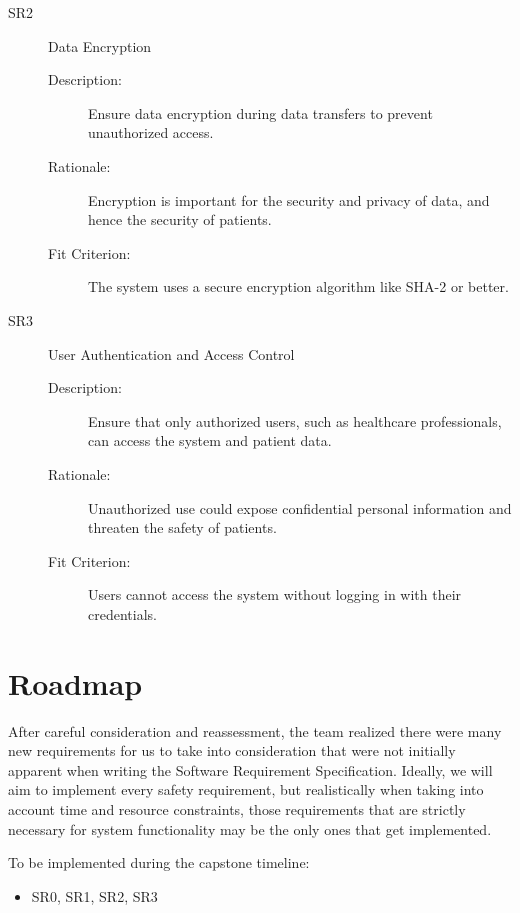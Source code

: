 \documentclass{article}
\begin{document}
\begin{description}
    \item[SR2] Data Encryption
    \begin{description}
        \item[Description:] Ensure data encryption during data transfers to prevent unauthorized access.
        \item[Rationale:] Encryption is important for the security and privacy of data, and hence the security of patients. 
        \item[Fit Criterion:] The system uses a secure encryption algorithm like SHA-2 or better. 
    \end{description}
\end{description}

\begin{description}
    \item[SR3] User Authentication and Access Control
    \begin{description}
        \item[Description:] Ensure that only authorized users, such as healthcare professionals, can access the system and patient data.
        \item[Rationale:] Unauthorized use could expose confidential personal information and threaten the safety of patients.
        \item[Fit Criterion:] Users cannot access the system without logging in with their credentials.
    \end{description}
\end{description}


\section{Roadmap}
After careful consideration and reassessment, the team realized there were many new requirements for us to take into consideration that were not initially apparent when writing the Software Requirement Specification. Ideally, we will aim to implement every safety requirement, but realistically when taking into account time and resource constraints, those requirements that are strictly necessary for system functionality may be the only ones that get implemented.

To be implemented during the capstone timeline: 
\begin{itemize}
    \item SR0, SR1, SR2, SR3
\end{itemize}
\end{document}
